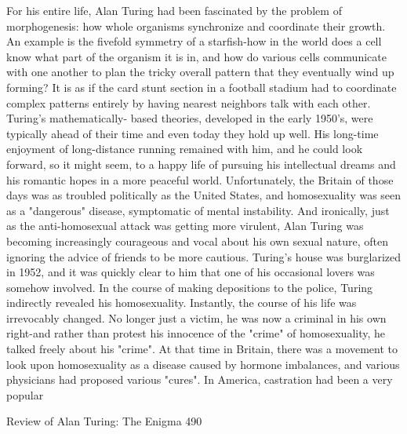         For his entire life, Alan Turing had been fascinated by the problem of
morphogenesis: how whole organisms synchronize and coordinate their growth. An
example is the fivefold symmetry of a starfish-how in the world does a cell know
what part of the organism it is in, and how do various cells communicate with one
another to plan the tricky overall pattern that they eventually wind up forming? It is as
if the card stunt section in a football stadium had to coordinate complex patterns
entirely by having nearest neighbors talk with each other. Turing's mathematically-
based theories, developed in the early 1950's, were typically ahead of their time and
even today they hold up well.
        His long-time enjoyment of long-distance running remained with him, and he
could look forward, so it might seem, to a happy life of pursuing his intellectual
dreams and his romantic hopes in a more peaceful world. Unfortunately, the Britain of
those days was as troubled politically as the United States, and homosexuality was
seen as a "dangerous" disease, symptomatic of mental instability. And ironically, just
as the anti-homosexual attack was getting more virulent, Alan Turing was becoming
increasingly courageous and vocal about his own sexual nature, often ignoring the
advice of friends to be more cautious.
        Turing's house was burglarized in 1952, and it was quickly clear to him that
one of his occasional lovers was somehow involved. In the course of making
depositions to the police, Turing indirectly revealed his homosexuality. Instantly, the
course of his life was irrevocably changed. No longer just a victim, he was now a
criminal in his own right-and rather than protest his innocence of the "crime" of
homosexuality, he talked freely about his "crime".
        At that time in Britain, there was a movement to look upon homosexuality as a
disease caused by hormone imbalances, and various physicians had proposed various
"cures". In America, castration had been a very popular




Review of Alan Turing: The Enigma                                                    490

